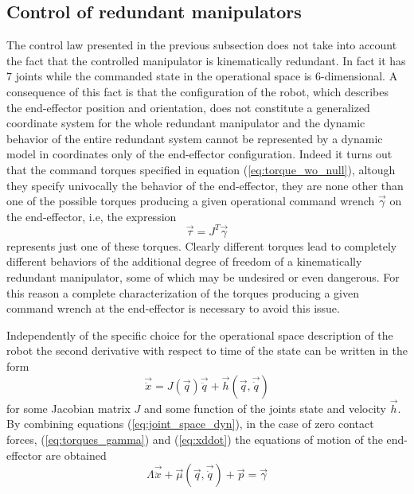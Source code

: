 \subsection{Control of redundant manipulators}
The control law presented in the previous subsection does not take into account
the fact that the controlled manipulator is kinematically redundant. In fact it has
7 joints while the commanded state in the operational space is 6-dimensional.
A consequence of this fact is that \cite{Khatib1987} the configuration of the robot, which describes the
end-effector position and orientation, does not constitute a generalized coordinate
system for the whole redundant manipulator and the dynamic behavior of the entire redundant
system cannot be represented by a dynamic model in coordinates only of the end-effector
configuration. Indeed it turns out that the command torques specified in equation (\ref{eq:torque_wo_null}),
altough they specify univocally the behavior of the end-effector, they are none other than one of the
possible torques producing a given operational command wrench $\vec{\gamma}$ on the end-effector, i.e,
the expression
\begin{equation}\label{eq:torques_gamma}
  \vec{\tau} = J^{T} \vec{\gamma}
\end{equation}
represents just one of these torques. Clearly different torques lead to completely different behaviors
of the additional degree of freedom of a kinematically redundant manipulator, some of which may be undesired
or even dangerous. For this reason a complete characterization of the torques producing a given command wrench
at the end-effector is necessary to avoid this issue.
\par
Independently of the specific choice for the operational space description of the robot
the second derivative with respect to time of the state can be written in the form
\begin{equation}\label{eq:xddot}
  \vec{\ddot{x}} = J(\vec{q}) \vec{\ddot{q}} + \vec{h}(\vec{q},\vec{\dot{q}})
\end{equation}
for some Jacobian matrix $J$ and some function of the joints state and velocity $\vec{h}$.
By combining equations (\ref{eq:joint_space_dyn}), in the case of zero contact forces,
(\ref{eq:torques_gamma}) and (\ref{eq:xddot}) the equations of motion of the end-effector
are obtained
\begin{equation}\label{eq:operational_space_dyn}
  \Lambda \vec{\ddot{x}} + \vec{\mu}(\vec{q}, \vec{\dot{q}}) + \vec{p} = \vec{\gamma}
\end{equation}
